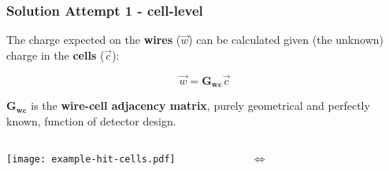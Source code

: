 \documentclass[xcolor=dvipsnames]{beamer}
\begin{document}
\begin{frame}[fragile]
  \frametitle{Solution Attempt 1 - cell-level}
  The charge expected on the \textbf{wires} ($\vec{w}$) can be calculated
  given (the unknown) charge in the \textbf{cells} ($\vec{c}$):

  \[\vec{w} = \mathbf{G_{wc}}\vec{c}\]

  $\mathbf{G_{wc}}$ is the \textbf{wire-cell adjacency matrix}, purely
  geometrical and perfectly known, function of detector design.
  
  \begin{columns}
    \begin{column}{0.45\textwidth}
      \vspace{-5mm}

      \flushright \texttt{[image: example-hit-cells.pdf]}

    \end{column}
    \begin{column}{0.10\textwidth}
      $\Leftrightarrow$
    \end{column}
    \begin{column}{0.45\textwidth}

\end{column}
\end{columns}
\end{frame}
\end{document}
